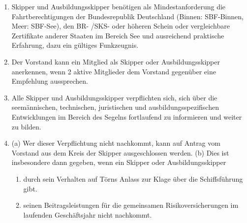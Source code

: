 \documentclass[10pt, twocolumn, parskip=half]{scrartcl}
\begin{document}
\begin{enumerate}[noitemsep]
	\item Skipper und Ausbildungsskipper benötigen als Mindestanforderung die Fahrtberechtigungen der Bundesrepublik Deutschland (Binnen: SBF-Binnen, Meer: SBF-See), den BR- /SKS- oder höheren Schein oder vergleichbare Zertifikate anderer Staaten im Bereich See und ausreichend praktische Erfahrung, dazu ein gültiges Funkzeugnis.
	\item Der Vorstand kann ein Mitglied als Skipper oder Ausbildungsskipper anerkennen, wenn 2 aktive Mitglieder dem Vorstand gegenüber eine Empfehlung aussprechen.
	\item Alle Skipper und Ausbildungsskipper verpflichten sich, sich über die seemännischen, technischen, juristischen und ausbildungsspezifischen Entwicklungen im Bereich des Segelns fortlaufend zu informieren und weiter zu bilden.
	\item (a) Wer dieser Verpflichtung nicht nachkommt, kann auf Antrag vom Vorstand aus dem Kreis der Skipper ausgeschlossen werden. (b) Dies ist insbesondere dann gegeben, wenn ein Skipper oder Ausbildungsskipper
	\begin{enumerate}[noitemsep]
		\item  durch sein Verhalten auf Törns Anlass zur Klage über die Schiffsführung gibt.
		\item seinen Beitragsleistungen für die gemeinsamen Risikoversicherungen im laufenden Geschäftsjahr nicht nachkommt.
		

\end{enumerate}
\end{enumerate}
\end{document}
